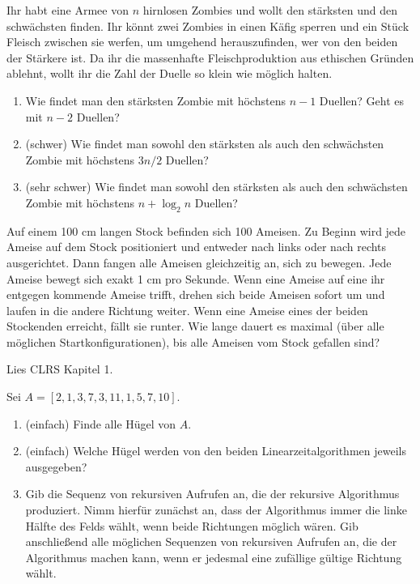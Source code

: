 \documentclass{uebung_cs}
\begin{document}
\begin{aufgabe}[Zombieduelle]
	Ihr habt eine Armee von $n$ hirnlosen Zombies und wollt den stärksten und den schwächsten finden. Ihr könnt zwei Zombies in einen Käfig sperren und ein Stück Fleisch zwischen sie werfen, um umgehend herauszufinden, wer von den beiden der Stärkere ist. Da ihr die massenhafte Fleischproduktion aus ethischen Gründen ablehnt, wollt ihr die Zahl der Duelle so klein wie möglich halten.
	\begin{enumerate}
		\item Wie findet man den stärksten Zombie mit höchstens $n-1$ Duellen? Geht es mit $n-2$ Duellen?
		\item (schwer) Wie findet man sowohl den stärksten als auch den schwächsten Zombie mit höchstens $3n/2$ Duellen?
		\item (sehr schwer) Wie findet man sowohl den stärksten als auch den schwächsten Zombie mit höchstens $n+\log_2 n$ Duellen?
	\end{enumerate}
\end{aufgabe}

\begin{aufgabe}\label{tue-last}
	Auf einem 100 cm langen Stock befinden sich 100 Ameisen.
	Zu Beginn wird jede Ameise auf dem Stock positioniert und entweder nach links oder nach rechts ausgerichtet.
	Dann fangen alle Ameisen gleichzeitig an, sich zu bewegen.
	Jede Ameise bewegt sich exakt 1 cm pro Sekunde. Wenn eine Ameise auf eine ihr entgegen kommende Ameise trifft, drehen sich beide Ameisen sofort um und laufen in die andere Richtung weiter.
	Wenn eine Ameise eines der beiden Stockenden erreicht, fällt sie runter.
	Wie lange dauert es maximal (über alle möglichen Startkonfigurationen), bis alle Ameisen vom Stock gefallen sind?
\end{aufgabe}

\begin{aufgabe}\label{lesen}
	Lies CLRS Kapitel 1.
\end{aufgabe}

\begin{aufgabe}[Hügel]\label{thu-first}
	Sei $A = [2, 1, 3, 7, 3, 11, 1, 5, 7, 10]$.
	\begin{enumerate}
		\item (einfach) Finde alle Hügel von $A$.
		\item (einfach) Welche Hügel werden von den beiden Linearzeitalgorithmen jeweils ausgegeben?
		\item Gib die Sequenz von rekursiven Aufrufen an, die der rekursive Algorithmus produziert. Nimm hierfür zunächst an, dass der Algorithmus immer die linke Hälfte des Felds wählt, wenn beide Richtungen möglich wären. Gib anschließend alle möglichen Sequenzen von rekursiven Aufrufen an, die der Algorithmus machen kann, wenn er jedesmal eine zufällige gültige Richtung wählt.
	\end{enumerate}
\end{aufgabe}
\end{document}
